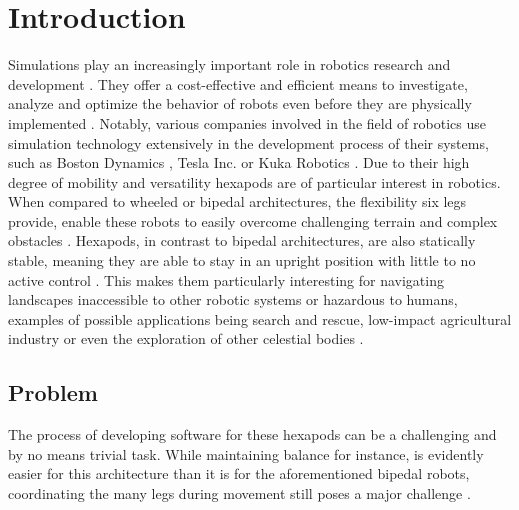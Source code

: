 \chapter{Introduction}
\label{ch:introduction}

Simulations play an increasingly important role in robotics research and development \parencite{afzal2020study}. 
They offer a cost-effective and efficient means to investigate, analyze and optimize the behavior of robots even before they are physically implemented \parencite{de2019analysis}. 
Notably, various companies involved in the field of robotics use simulation technology extensively in the development process of their systems, such as Boston Dynamics \parencite{BostonDynamicsSimulation}, Tesla Inc. \parencite{TeslaAiDay2022} or Kuka Robotics \parencite{KukaSim}.
Due to their high degree of mobility and versatility hexapods are of particular interest in robotics. 
When compared to wheeled or bipedal architectures, the flexibility six legs provide, enable these robots to easily overcome challenging terrain and complex obstacles \parencite{barai2013smart, atifystructure}.
Hexapods, in contrast to bipedal architectures, are also statically stable, meaning they are able to stay in an upright position with little to no active control \parencite{azayev2020blind}. 
This makes them particularly interesting for navigating landscapes inaccessible to other robotic systems or hazardous to humans, examples of possible applications being search and rescue, low-impact agricultural industry or even the exploration of other celestial bodies \parencite{trotta2022walking, billah2008walking}.

\section{Problem}
The process of developing software for these hexapods can be a challenging and by no means trivial task. %
While maintaining balance for instance, is evidently easier for this architecture than it is for the aforementioned bipedal robots, coordinating the many legs during movement still poses a major challenge \parencite{azayev2020blind,schilling2013walknet}.

